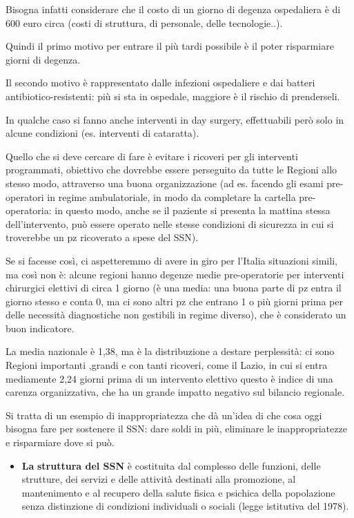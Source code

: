 Bisogna infatti considerare che il costo di un giorno di degenza
ospedaliera è di 600 euro circa (costi di struttura, di personale, delle
tecnologie..).

Quindi il primo motivo per entrare il più tardi possibile è il poter
risparmiare giorni di degenza.

Il secondo motivo è rappresentato dalle infezioni ospedaliere e dai
batteri antibiotico-resistenti: più si sta in ospedale, maggiore è il
rischio di prenderseli.

In qualche caso si fanno anche interventi in day surgery, effettuabili
però solo in alcune condizioni (es. interventi di cataratta).

Quello che si deve cercare di fare è evitare i ricoveri per gli
interventi programmati, obiettivo che dovrebbe essere perseguito da
tutte le Regioni allo stesso modo, attraverso una buona organizzazione
(ad es. facendo gli esami pre-operatori in regime ambulatoriale, in modo
da completare la cartella pre-operatoria: in questo modo, anche se il
paziente si presenta la mattina stessa dell'intervento, può essere
operato nelle stesse condizioni di sicurezza in cui si troverebbe un pz
ricoverato a spese del SSN).

Se si facesse così, ci aspetteremmo di avere in giro per l'Italia
situazioni simili, ma così non è: alcune regioni hanno degenze medie
pre-operatorie per interventi chirurgici elettivi di circa 1 giorno (è
una media: una buona parte di pz entra il giorno stesso e conta 0, ma ci
sono altri pz che entrano 1 o più giorni prima per delle necessità
diagnostiche non gestibili in regime diverso), che è considerato un buon
indicatore.

La media nazionale è 1,38, ma è la distribuzione a destare perplessità:
ci sono Regioni importanti ,grandi e con tanti ricoveri, come il Lazio,
in cui si entra mediamente 2,24 giorni prima di un intervento elettivo
questo è indice di una carenza organizzativa, che ha un grande impatto
negativo sul bilancio regionale.

Si tratta di un esempio di inappropriatezza che dà un'idea di che cosa
oggi bisogna fare per sostenere il SSN: dare soldi in più, eliminare le
inappropriatezze e risparmiare dove si può.

\begin{itemize}
\item
  \textbf{La} \textbf{struttura del SSN} è costituita dal complesso
  delle funzioni, delle strutture, dei servizi e delle attività
  destinati alla promozione, al mantenimento e al recupero della salute
  fisica e psichica della popolazione senza distinzione di condizioni
  individuali o sociali (legge istitutiva del 1978).
\end{itemize}

